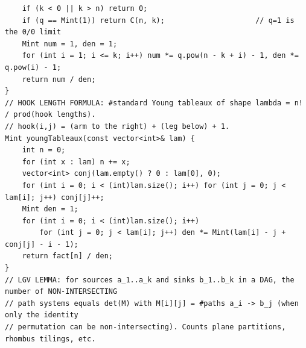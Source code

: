 \documentclass[9pt,a4paper,twocolumn]{extarticle}
\begin{document}
\begin{lstlisting}
    if (k < 0 || k > n) return 0;
    if (q == Mint(1)) return C(n, k);                     // q=1 is the 0/0 limit
    Mint num = 1, den = 1;
    for (int i = 1; i <= k; i++) num *= q.pow(n - k + i) - 1, den *= q.pow(i) - 1;
    return num / den;
}
// HOOK LENGTH FORMULA: #standard Young tableaux of shape lambda = n! / prod(hook lengths).
// hook(i,j) = (arm to the right) + (leg below) + 1.
Mint youngTableaux(const vector<int>& lam) {
    int n = 0;
    for (int x : lam) n += x;
    vector<int> conj(lam.empty() ? 0 : lam[0], 0);
    for (int i = 0; i < (int)lam.size(); i++) for (int j = 0; j < lam[i]; j++) conj[j]++;
    Mint den = 1;
    for (int i = 0; i < (int)lam.size(); i++)
        for (int j = 0; j < lam[i]; j++) den *= Mint(lam[i] - j + conj[j] - i - 1);
    return fact[n] / den;
}
// LGV LEMMA: for sources a_1..a_k and sinks b_1..b_k in a DAG, the number of NON-INTERSECTING
// path systems equals det(M) with M[i][j] = #paths a_i -> b_j (when only the identity
// permutation can be non-intersecting). Counts plane partitions, rhombus tilings, etc.
\end{lstlisting}

\filbreak
\end{document}
